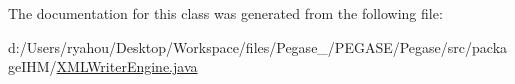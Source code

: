 The documentation for this class was generated from the following file\+:\begin{DoxyCompactItemize}
\item 
d\+:/\+Users/ryahou/\+Desktop/\+Workspace/files/\+Pegase\+\_/\+P\+E\+G\+A\+S\+E/\+Pegase/src/package\+I\+H\+M/\mbox{\hyperlink{_x_m_l_writer_engine_8java}{X\+M\+L\+Writer\+Engine.\+java}}\end{DoxyCompactItemize}
